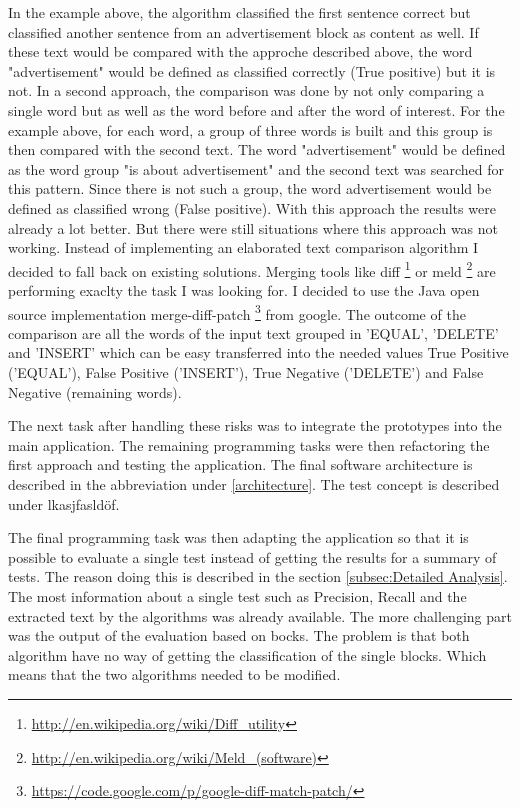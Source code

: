 In the example above, the algorithm classified the first sentence correct but classified another sentence from an advertisement block as content as well. If these text would be compared with the approche described above, the word "advertisement" would be defined as classified correctly (True positive) but it is not. 
In a second approach, the comparison was done by not only comparing a single word but as well as the word before and after the word of interest. 
For the example above, for each word, a group of three words is built and this group is then compared with the second text. The word "advertisement" would be defined as the word group "is about advertisement" and the second text was searched for this pattern. Since there is not such a group, the word advertisement would be defined as classified wrong (False positive). With this approach the results were already a lot better. But there were still situations where this approach was not working. Instead of implementing an elaborated text comparison algorithm I decided to fall back on existing solutions. Merging tools like diff \footnote{\url{http://en.wikipedia.org/wiki/Diff\_utility}} or meld \footnote{\url{http://en.wikipedia.org/wiki/Meld\_(software)}} are performing exaclty the task I was looking for. I decided to use the Java open source implementation merge-diff-patch \footnote{\url{https://code.google.com/p/google-diff-match-patch/}} from google.  The outcome of the comparison are all the words of the input text grouped in 'EQUAL', 'DELETE' and 'INSERT' which can be easy transferred into the needed values True Positive ('EQUAL'), False Positive ('INSERT'), True Negative ('DELETE') and False Negative (remaining words). 


The next task after handling these risks was to integrate the prototypes into the main application. The remaining programming tasks were then refactoring the first approach and testing the application. The final software architecture is described in the abbreviation under \ref{architecture}. The test concept is described under lkasjfasldöf. 

The final programming task was then adapting the application so that it is possible to evaluate a single test instead of getting the results for a summary of tests. The reason doing this is described in the section \ref{subsec:Detailed Analysis}. 
The most information about a single test such as Precision, Recall and the extracted text by the algorithms was already available. The more challenging part was the output of the evaluation based on bocks. The problem is that both algorithm have no way of getting the classification of the single blocks. Which means that the two algorithms needed to be modified.

